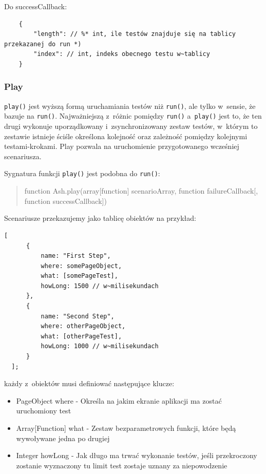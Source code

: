 \documentclass[brudnopis]{xmgr}
\begin{document}
Do successCallback: 

\begin{lstlisting}
	{
		"length": // %* int, ile testów znajduje się na tablicy przekazanej do run *) 
		"index": // int, indeks obecnego testu w~tablicy 
	}
\end{lstlisting}

\subsubsection{Play} 

\texttt{play()} jest wyższą formą uruchamiania testów niż \texttt{run()}, ale tylko w~sensie, że bazuje na \texttt{run()}. Najważniejszą z~różnic pomiędzy \texttt{run()} a~\texttt{play()} jest to, że ten drugi wykonuje uporządkowany i~zsynchronizowany zestaw testów, w~którym to zestawie istnieje ściśle określona kolejność oraz zależność pomiędzy kolejnymi testami-krokami. Play pozwala na uruchomienie przygotowanego wcześniej scenariusza. 

Sygnatura funkcji \texttt{play()} jest podobna do \texttt{run()}:

\begin{quote}
function Ash.play(array[function] scenarioArray, function failureCallback[, function successCallback]) 
\end{quote}

Scenariusze przekazujemy jako tablicę obiektów na przykład:

\begin{lstlisting}
[
      {
          name: "First Step",
          where: somePageObject,
          what: [somePageTest],
          howLong: 1500	// w~milisekundach
      },
      {
          name: "Second Step",
          where: otherPageObject,
          what: [otherPageTest],
          howLong: 1000	// w~milisekundach
      }
  ];
\end{lstlisting}

każdy z~obiektów musi definiować następujące klucze:

\begin{itemize}
  \item PageObject where - Określa na jakim ekranie aplikacji ma zostać uruchomiony test
  \item Array[Function] what - Zestaw bezparametrowych funkcji, które będą wywoływane jedna po drugiej 
  \item Integer howLong - Jak długo ma trwać wykonanie testów, jeśli przekroczony zostanie wyznaczony tu limit test zostaje uznany za niepowodzenie 
\end{itemize}
\end{document}
